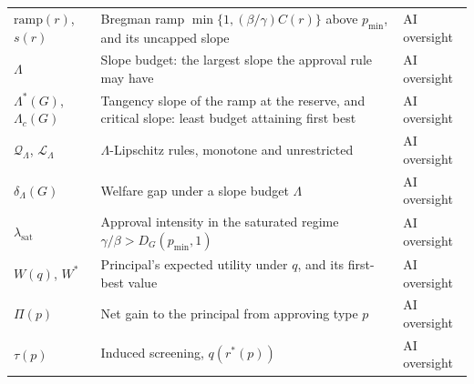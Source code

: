 \documentclass[acmsmall,nonacm,screen]{acmart}
\theoremstyle{acmplain}%
\theoremstyle{acmdefinition}%
\numberwithin{equation}{section}
\begin{document}
\begin{center}
\begin{tabular}{lp{8cm}l}
$\mathrm{ramp}(r)$, $s(r)$ & Bregman ramp $\min\{1,(\beta/\gamma)C(r)\}$ above $p_{\min}$, and its uncapped slope & AI oversight \\
$\Lambda$ & Slope budget: the largest slope the approval rule may have & AI oversight \\
$\Lambda^*(G)$, $\Lambda_c(G)$ & Tangency slope of the ramp at the reserve, and critical slope: least budget attaining first best & AI oversight \\
$\mathcal Q_\Lambda$, $\mathcal L_\Lambda$ & $\Lambda$-Lipschitz rules, monotone and unrestricted & AI oversight \\
$\delta_\Lambda(G)$ & Welfare gap under a slope budget $\Lambda$ & AI oversight \\
$\lambda_{\mathrm{sat}}$ & Approval intensity in the saturated regime $\gamma/\beta > D_G(p_{\min},1)$ & AI oversight \\
$W(q)$, $W^*$ & Principal's expected utility under $q$, and its first-best value & AI oversight \\
$\Pi(p)$ & Net gain to the principal from approving type $p$ & AI oversight \\
$\tau(p)$ & Induced screening, $q(r^*(p))$ & AI oversight \\
\hline
\end{tabular}
\end{center}
\end{document}
